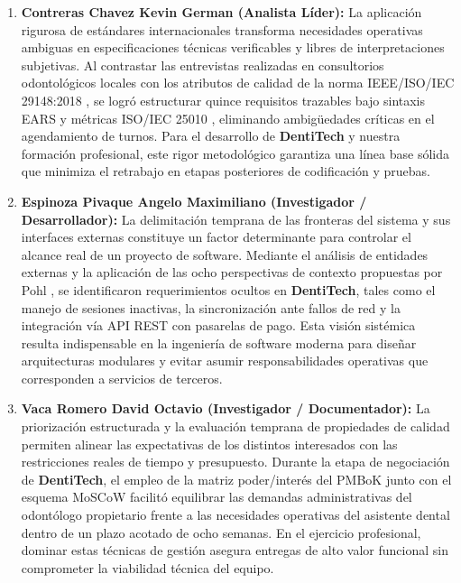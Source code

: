 \documentclass[11pt,a4paper]{article}
\begin{document}
\begin{enumerate}
    \item \textbf{Contreras Chavez Kevin German (Analista Líder):} La aplicación rigurosa de estándares internacionales transforma necesidades operativas ambiguas en especificaciones técnicas verificables y libres de interpretaciones subjetivas. Al contrastar las entrevistas realizadas en consultorios odontológicos locales con los atributos de calidad de la norma IEEE/ISO/IEC 29148:2018 \cite{ieee29148}, se logró estructurar quince requisitos trazables bajo sintaxis EARS \cite{mavin2009} y métricas ISO/IEC 25010 \cite{iso25010}, eliminando ambigüedades críticas en el agendamiento de turnos. Para el desarrollo de \textbf{DentiTech} y nuestra formación profesional, este rigor metodológico garantiza una línea base sólida que minimiza el retrabajo en etapas posteriores de codificación y pruebas.

    \item \textbf{Espinoza Pivaque Angelo Maximiliano (Investigador / Desarrollador):} La delimitación temprana de las fronteras del sistema y sus interfaces externas constituye un factor determinante para controlar el alcance real de un proyecto de software. Mediante el análisis de entidades externas y la aplicación de las ocho perspectivas de contexto propuestas por Pohl \cite{pohl2025}, se identificaron requerimientos ocultos en \textbf{DentiTech}, tales como el manejo de sesiones inactivas, la sincronización ante fallos de red y la integración vía API REST con pasarelas de pago. Esta visión sistémica resulta indispensable en la ingeniería de software moderna para diseñar arquitecturas modulares y evitar asumir responsabilidades operativas que corresponden a servicios de terceros.

    \item \textbf{Vaca Romero David Octavio (Investigador / Documentador):} La priorización estructurada y la evaluación temprana de propiedades de calidad permiten alinear las expectativas de los distintos interesados con las restricciones reales de tiempo y presupuesto. Durante la etapa de negociación de \textbf{DentiTech}, el empleo de la matriz poder/interés del PMBoK \cite{pmbok2021} junto con el esquema MoSCoW facilitó equilibrar las demandas administrativas del odontólogo propietario frente a las necesidades operativas del asistente dental dentro de un plazo acotado de ocho semanas. En el ejercicio profesional, dominar estas técnicas de gestión asegura entregas de alto valor funcional sin comprometer la viabilidad técnica del equipo.
\end{enumerate}
\end{document}
